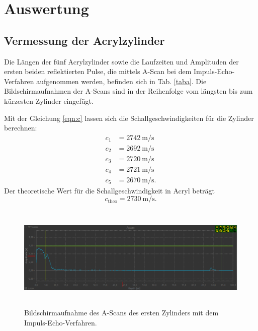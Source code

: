\section{Auswertung}
\label{sec:Auswertung}
\subsection{Vermessung der Acrylzylinder}
Die Längen der fünf Acrylzylinder sowie die Laufzeiten und Amplituden
der ersten beiden reflektierten Pulse, %
die mittels A-Scan bei dem Impuls-Echo-Verfahren aufgenommen werden, %
befinden sich in Tab. \ref{taba}.
Die Bildschirmaufnahmen der A-Scans sind in der Reihenfolge
vom längsten bis zum kürzesten Zylinder eingefügt.



\noindent Mit der Gleichung \eqref{eqn:c} lassen sich die Schallgeschwindigkeiten
für die Zylinder berechnen:
\begin{align*}
    c_1 &= \SI{2742}{\meter\per\second} \\
    c_2 &= \SI{2692}{\meter\per\second} \\
    c_3 &= \SI{2720}{\meter\per\second} \\
    c_4 &= \SI{2721}{\meter\per\second} \\
    c_5 &= \SI{2670}{\meter\per\second}.
\end{align*}
Der theoretische Wert für die Schallgeschwindigkeit in Acryl \cite{c} beträgt
\begin{equation*}
    c_{\text{theo}} = \SI{2730}{\meter\per\second}.
\end{equation*}

\begin{figure}
    \centering
    \includegraphics[width=15cm, height=5cm]{build/Messung1.1.png}
    \caption{Bildschirmaufnahme des A-Scans des ersten Zylinders mit dem Impuls-Echo-Verfahren.}
    \label{m1.1}
\end{figure}

